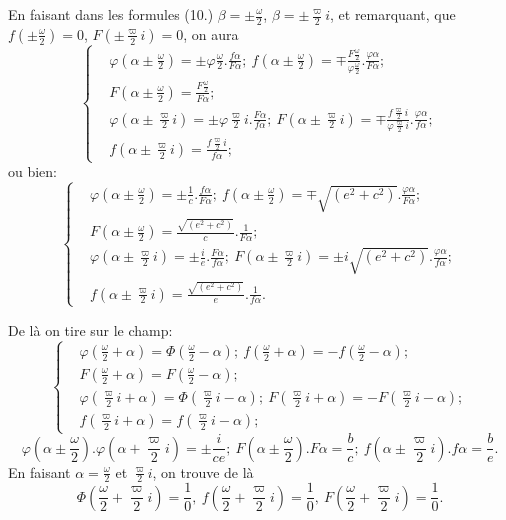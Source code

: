 \documentclass{article}
\begin{document}
En faisant dans les formules (10.) $\beta=\pm\frac{\omega}{2}$, $\beta=\pm\frac{\varpi}{2}i$, et remarquant, que $f\left(\pm\frac{\omega}{2}\right)=0$, $F\left(\pm\frac{\varpi}{2}i\right)=0$, on aura
\[ \left\{\begin{aligned} &\varphi\left(\alpha\pm\frac{\omega}{2}\right)=\pm\varphi\frac{\omega}{2}.\frac{f\alpha}{F\alpha};\ f\left(\alpha\pm\frac{\omega}{2}\right)=\mp\frac{F\frac{\omega}{2}}{\varphi\frac{\omega}{2}}.\frac{\varphi\alpha}{F\alpha};\\ &F\left(\alpha\pm\frac{\omega}{2}\right)=\frac{F\frac{\omega}{2}}{F\alpha};\\ &\varphi\left(\alpha\pm\frac{\varpi}{2}i\right)=\pm\varphi\frac{\varpi}{2}i.\frac{F\alpha}{f\alpha};\ F\left(\alpha\pm\frac{\varpi}{2}i\right)=\mp\frac{f\frac{\varpi}{2}i}{\varphi\frac{\varpi}{2}i}.\frac{\varphi\alpha}{f\alpha};\\ &f\left(\alpha\pm\frac{\varpi}{2}i\right)=\frac{f\frac{\varpi}{2}i}{f\alpha}; \end{aligned}\right. \tag{15.} \]
ou bien:
\[ \left\{\begin{aligned} &\varphi\left(\alpha\pm\frac{\omega}{2}\right)=\pm\frac{1}{c}.\frac{f\alpha}{F\alpha};\ f\left(\alpha\pm\frac{\omega}{2}\right)=\mp\sqrt{(e^{2}+c^{2})}.\frac{\varphi\alpha}{F\alpha};\\ &F\left(\alpha\pm\frac{\omega}{2}\right)=\frac{\sqrt{(e^{2}+c^{2})}}{c}.\frac{1}{F\alpha};\\ &\varphi\left(\alpha\pm\frac{\varpi}{2}i\right)=\pm\frac{i}{e}.\frac{F\alpha}{f\alpha};\ F\left(\alpha\pm\frac{\varpi}{2}i\right)=\pm i\sqrt{(e^{2}+c^{2})}.\frac{\varphi\alpha}{f\alpha};\\ &f\left(\alpha\pm\frac{\varpi}{2}i\right)=\frac{\sqrt{(e^{2}+c^{2})}}{e}.\frac{1}{f\alpha}. \end{aligned}\right. \tag{16.} \]

De là on tire sur le champ:
\[ \left\{\begin{aligned} &\varphi\left(\frac{\omega}{2}+\alpha\right)=\Phi\left(\frac{\omega}{2}-\alpha\right);\ f\left(\frac{\omega}{2}+\alpha\right)=-f\left(\frac{\omega}{2}-\alpha\right);\\ &F\left(\frac{\omega}{2}+\alpha\right)=F\left(\frac{\omega}{2}-\alpha\right);\\ &\varphi\left(\frac{\varpi}{2}i+\alpha\right)=\Phi\left(\frac{\varpi}{2}i-\alpha\right);\ F\left(\frac{\varpi}{2}i+\alpha\right)=-F\left(\frac{\varpi}{2}i-\alpha\right);\\ &f\left(\frac{\varpi}{2}i+\alpha\right)=f\left(\frac{\varpi}{2}i-\alpha\right); \end{aligned}\right. \tag{17.} \]
\[ \varphi\left(\alpha\pm\frac{\omega}{2}\right).\varphi\left(\alpha+\frac{\varpi}{2}i\right)=\pm\frac{i}{ce};\ F\left(\alpha\pm\frac{\omega}{2}\right).F\alpha=\frac{b}{c};\ f\left(\alpha\pm\frac{\varpi}{2}i\right).f\alpha=\frac{b}{e}. \tag{18.} \]
En faisant $\alpha=\frac{\omega}{2}$ et $\frac{\varpi}{2}i$, on trouve de là
\[ \Phi\left(\frac{\omega}{2}+\frac{\varpi}{2}i\right)=\frac{1}{0},\ f\left(\frac{\omega}{2}+\frac{\varpi}{2}i\right)=\frac{1}{0},\ F\left(\frac{\omega}{2}+\frac{\varpi}{2}i\right)=\frac{1}{0}. \]
\end{document}

